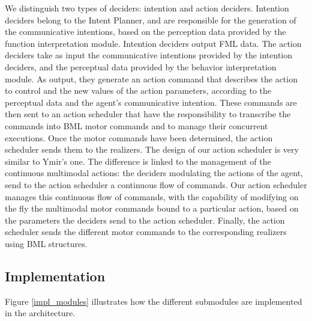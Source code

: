 We distinguish two types of deciders: intention and action deciders. 
Intention deciders belong to the Intent Planner, and are responsible for the generation of the communicative intentions, based on the perception data provided by the function interpretation module. Intention deciders output FML data. 
The action deciders take as input the communicative intentions provided by the intention deciders, and the perceptual data provided by the behavior interpretation module. As output, they generate an action command that describes the action to control and the new values of the action parameters, according to the perceptual data and the agent's communicative intention. 
These commands are then sent to an action scheduler that have the responsibility to transcribe the commands into BML motor commands and to manage their concurrent executions. Once the motor commands have been determined, the action scheduler sends them to the realizers. 
The design of our action scheduler is very similar to Ymir's one. The difference is linked to the management of the continuous multimodal actions: the deciders modulating the actions of the agent, send to the action scheduler a continuous flow of commands. Our action scheduler manages this continuous flow of commands, with the capability of modifying on the fly the multimodal motor commands bound to a particular action, based on the parameters the deciders send to the action scheduler. 
Finally, the action scheduler sends the different motor commands to the corresponding realizers using BML structures. 

\subsection{Implementation}


Figure \ref{impl_modules} illustrates how the different submodules are implemented in the architecture. 

